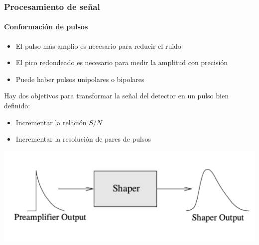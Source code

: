 \documentclass{beamer}
\begin{document}
\begin{frame}
\frametitle{Procesamiento de señal}
\framesubtitle{{\color{blue}Conformación de pulsos}}
\begin{itemize}
\item El pulso {\color{blue}más amplio} es necesario para {\color{blue}reducir el ruido} 
\item El \alert{pico redondeado} es necesario para \alert{medir la amplitud con precisión}
\item Puede haber pulsos unipolares o bipolares
\end{itemize}
Hay dos objetivos para transformar la señal del detector en un pulso bien definido:
\begin{itemize}
\item Incrementar la relación $S/N$ 
\item Incrementar la resolución de pares de pulsos
\end{itemize}
\begin{center}
\includegraphics[width=.8\textwidth]{d2/pulse_shaper} 
\end{center}
\end{frame} 
\end{document}
